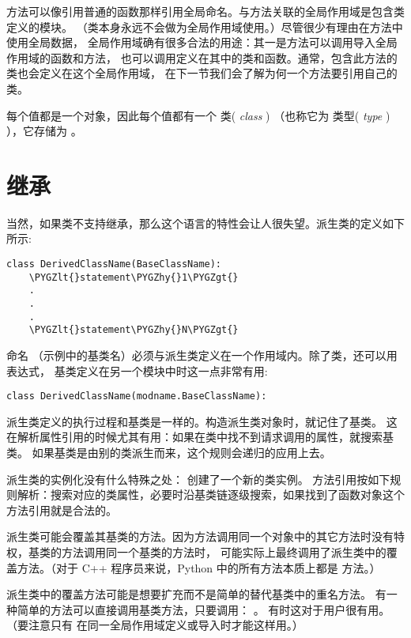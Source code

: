 \documentclass[a4paper,10pt,english]{sphinxmanual}
\def\PYGZlt{\char`\<}
\def\PYGZgt{\char`\>}
\def\PYGZhy{\char`\-}
\begin{document}
方法可以像引用普通的函数那样引用全局命名。与方法关联的全局作用域是包含类定义的模块。
（类本身永远不会做为全局作用域使用。）尽管很少有理由在方法中使用全局数据，
全局作用域确有很多合法的用途：其一是方法可以调用导入全局作用域的函数和方法，
也可以调用定义在其中的类和函数。通常，包含此方法的类也会定义在这个全局作用域，
在下一节我们会了解为何一个方法要引用自己的类。

每个值都是一个对象，因此每个值都有一个 类( \emph{class} ) （也称它为 类型( \emph{type} ) ），它存储为  。


\section{继承}
\label{classes:tut-inheritance}\label{classes:id12}
当然，如果类不支持继承，那么这个语言的特性会让人很失望。派生类的定义如下所示:

\begin{Verbatim}[commandchars=\\\{\}]
class DerivedClassName(BaseClassName):
    \PYGZlt{}statement\PYGZhy{}1\PYGZgt{}
    .
    .
    .
    \PYGZlt{}statement\PYGZhy{}N\PYGZgt{}
\end{Verbatim}

命名  （示例中的基类名）必须与派生类定义在一个作用域内。除了类，还可以用表达式，
基类定义在另一个模块中时这一点非常有用:

\begin{Verbatim}[commandchars=\\\{\}]
class DerivedClassName(modname.BaseClassName):
\end{Verbatim}

派生类定义的执行过程和基类是一样的。构造派生类对象时，就记住了基类。
这在解析属性引用的时候尤其有用：如果在类中找不到请求调用的属性，就搜索基类。
如果基类是由别的类派生而来，这个规则会递归的应用上去。

派生类的实例化没有什么特殊之处：  创建了一个新的类实例。
方法引用按如下规则解析：搜索对应的类属性，必要时沿基类链逐级搜索，如果找到了函数对象这个方法引用就是合法的。

派生类可能会覆盖其基类的方法。因为方法调用同一个对象中的其它方法时没有特权，基类的方法调用同一个基类的方法时，
可能实际上最终调用了派生类中的覆盖方法。（对于 C++ 程序员来说，Python 中的所有方法本质上都是  方法。）

派生类中的覆盖方法可能是想要扩充而不是简单的替代基类中的重名方法。
有一种简单的方法可以直接调用基类方法，只要调用： 。
有时这对于用户很有用。（要注意只有  在同一全局作用域定义或导入时才能这样用。）
\end{document}
